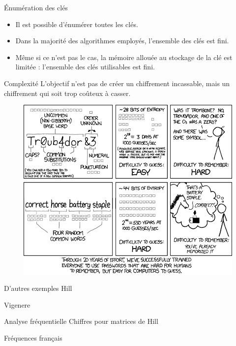 \documentclass{beamer}
\begin{document}
\begin{frame}{Énumération des clés}
  \begin{itemize}
  
  \item Il est possible d'énumérer toutes les clés.
  
  \item Dans la majorité des algorithmes employés, l'ensemble des clés est fini.
  
  \item Même si ce n'est pas le cas, la mémoire allouée au stockage de la clé est limitée : l'ensemble des clés utilisables est fini.
  
  \end{itemize}
  \end{frame}

\begin{frame}{Complexité}
  L'objectif n'est pas de créer un chiffrement incassable, mais un chiffrement qui soit trop coûteux à casser.
  
  \begin{figure}
  \centering
  \includegraphics[scale = 0.35]{xkcdpassword_strength.png}
  \end{figure}
  \end{frame}

\begin{frame}{D'autres exemples}
  Hill

  Vigenere
  \end{frame}

\begin{frame}{Analyse fréquentielle}
  Chiffres pour matrices de Hill

  Fréquences français
  \end{frame}
\end{document}
